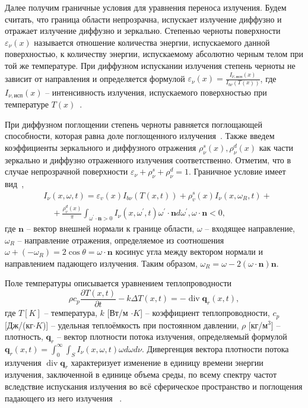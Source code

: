 Далее получим граничные условия для уравнения переноса излучения.
Будем считать, что граница области непрозрачна, испускает излучение диффузно
и отражает излучение диффузно и зеркально.
Степенью черноты поверхности $\varepsilon_\nu(x)$ называется отношение количества энергии,
испускаемого данной поверхностью, к количеству энергии, испускаемому абсолютно черным телом при
той же температуре.
При диффузном испускании излучения степень черноты не зависит от направления и определяется формулой
$\varepsilon_\nu(x) = \frac{I_{\nu,\text{исп}}(x)}{I_{b\nu}(T(x))}$, где
$I_{\nu,\text{исп}}(x)$ -- интенсивность излучения, испускаемого
поверхностью при температуре $T(x)$~\cite[53]{Ozisik1976}.

При диффузном поглощении степень черноты равняется
поглощающей способности, которая равна доле
поглощенного излучения~\cite[66]{modest2013radiative}.
Также введем коэффициенты зеркального и диффузного отражения
$\rho^s_\nu(x), \rho^d_\nu(x)$ как части зеркально и диффузно отраженного излучения соответственно.
Отметим, что в случае непрозрачной поверхности
$\varepsilon_\nu + \rho^s_\nu + \rho^d_\nu = 1$.
Граничное условие имеет вид~\cite[289]{modest2013radiative},~\cite{Kovtanyuk2014a}
\begin{equation}
    \label{eq:1_1:2}
    \begin{aligned}
        &I_\nu(x, \omega, t)=\varepsilon_v(x) I_{b \nu}(T(x, t))
        +\rho_v^s(x) I_\nu\left(x, \omega_R, t\right)+ \\
        &\quad+\frac{\rho_v^d(x)}{\pi} \int_{\omega^{\prime}
        \cdot \mathbf{n}>0} I_\nu\left(x, \omega^{\prime},
        t\right) \omega^{\prime} \cdot \mathbf{n} d \omega^{\prime},
        \omega \cdot \mathbf{n} < 0,
    \end{aligned}
\end{equation}
где $\mathbf{n}$ -- вектор внешней нормали к границе области,
$\omega$ -- входящее направление,
$\omega_R$ -- направление отражения, определяемое из соотношения
$\omega + (-\omega_R) = 2 \cos \theta = \omega \cdot \mathbf{n}$
косинус угла между
вектором нормали и направлением падающего излучения.
Таким образом, $\omega_R = \omega -2(\omega \cdot \mathbf{n})\mathbf{n}$.


Поле температуры описывается уравнением теплопроводности~\cite[297]{modest2013radiative}
\[
    \rho c_p \frac{\partial T(x, t)}{\partial t} - k \Delta T(x, t)
    = - \operatorname{div} \mathbf{q}_r(x, t),
\]
где $T [K]$ -- температура, $k$ [Вт/м $\cdot K$]
-- коэффициент теплопроводности, $c_p$ [Дж/(кг$\cdot K$)] --
удельная теплоёмкость при постоянном
давлении, $\rho$ [кг/$\text{м}^3$] -- плотность,
$\mathbf{q}_r$ -- вектор плотности потока излучения,
определяемый формулой~\cite[292]{modest2013radiative}
$\mathbf{q}_r(x, t) = \int^\infty_0\int_S I_\nu(x,\omega,t)\omega d\omega d\nu$.
Дивергенция вектора плотности потока излучения $\operatorname{div} \mathbf{q}_r$
характеризует изменение в единицу времени энергии излучения,
заключенной в единице объема среды, по всему спектру частот вследствие испускания
излучения во всё сферическое пространство и поглощения падающего
из него излучения ~\cite[274]{Ozisik1976}.


